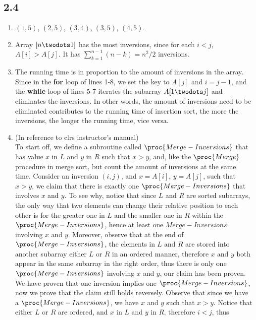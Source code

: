 \subsection{2.4}
\begin{enumerate}[leftmargin=*]
	\item $(1,5)$, $(2,5)$, $(3,4)$, $(3,5)$, $(4,5)$.
	\item Array $[n\twodots 1]$ has the most inversions,
		since for each $i<j$, $A[i]>A[j]$. It has
	$\sum_{k=1}^{n-1}(n-k)=n^2/2$ inversions.
	\item The running time is in proportion to the
		amount of inversions in the array. Since in the
		\textbf{for} loop of lines 1-8, we set the key
		to $A[j]$ and $i=j-1$, and the \textbf{while}
		loop of lines 5-7 iterates the subarray
		$A[1\twodots j]$ and eliminates the inversions.
		In other words, the amount of inversions need
		to be eliminated contributes to the running
		time of insertion sort, the more the inversions,
		the longer the running time, vice versa.
	\item (In reference to clrs instructor's manual)\\
		To start off, we define a subroutine called
		$\proc{Merge-Inversions}$ that has value $x$
		in $L$ and $y$ in $R$ such that $x>y$, and,
		like the
		$\proc{Merge}$ procedure in merge sort, but
		count the amount of inversions at the same
		time. Consider an inversion $(i,j)$, and
		$x=A[i]$, $y=A[j]$, such that $x>y$,
		we claim that there is
		exactly one $\proc{Merge-Inversions}$ that
		involves $x$ and $y$. To see why, notice that
		since $L$ and $R$ are sorted subarrays, the
		only way that two elements can change their
		relative position to each other is for the
		greater one in $L$ and the smaller one in
		$R$ within the $\proc{Merge-Inversions}$, hence
		at least one $Merge-Inversions$ involving
		$x$ and $y$. Moreover, observe that at the
		end of $\proc{Merge-Inversions}$, the elements in
		$L$ and $R$ are stored into another subarray
		either $L$ or $R$ in an ordered manner,
		therefore $x$ and $y$ both appear in the same
		subarray in the right order, thus
		there is only one $\proc{Merge-Inversions}$ involving
		$x$ and $y$, our claim has been proven.\\
		We have proven that one inversion implies
		one $\proc{Merge-Inversions}$, now we prove
		that the claim still holds reversely. Observe
		that since we have a $\proc{Merge-Inversions}$,
		we have $x$ and $y$ such that $x>y$. Notice
		that either $L$ or $R$ are ordered, and $x$
		in $L$ and $y$ in $R$, therefore $i<j$, thus

\end{enumerate}
